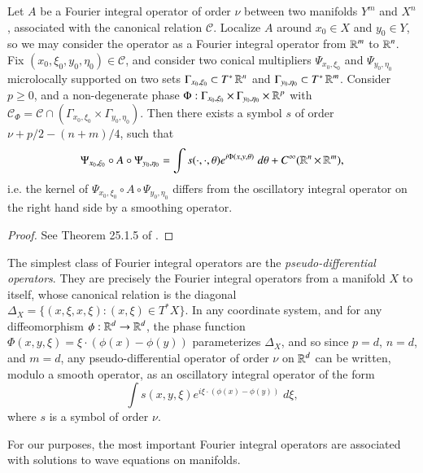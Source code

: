 \begin{theorem} \label{thm:equivalenceofphase}
  Let $A$ be a Fourier integral operator of order $\nu$ between two manifolds $Y^m$ and $X^n$, associated with the canonical relation $\mathcal{C}$. Localize $A$ around $x_0 \in X$ and $y_0 \in Y$, so we may consider the operator as a Fourier integral operator from $\operatorname{\mathbb{R}}^m$ to $\operatorname{\mathbb{R}}^n$. Fix $(x_0,\xi_0,y_0,\eta_0) \in \mathcal{C}$, and consider two conical multipliers $\Psi_{x_0,\xi_0}$ and $\Psi_{y_0,\eta_0}$ microlocally supported on two sets $\Gamma_{x_0,\xi_0} \subset T^* \operatorname{\mathbb{R}}^n$ and $\Gamma_{y_0,\eta_0} \subset T^* \operatorname{\mathbb{R}}^m$. Consider $p \geq 0$, and a non-degenerate phase $\Phi: \Gamma_{x_0,\xi_0} \times \Gamma_{y_0,\eta_0} \times \operatorname{\mathbb{R}}^p$ with $\mathcal{C}_\Phi = \mathcal{C} \cap (\Gamma_{x_0,\xi_0} \times \Gamma_{y_0,\eta_0})$. Then there exists a symbol $s$ of order $\nu + p/2 - (n+m)/4$, such that
  \[ \Psi_{x_0,\xi_0} \circ A \circ \Psi_{y_0,\eta_0} = \int s(\cdot,\cdot,\theta) e^{i \Phi(x,y,\theta)}\; d\theta + C^\infty(\operatorname{\mathbb{R}}^n \times \operatorname{\mathbb{R}}^m), \]
  i.e. the kernel of $\Psi_{x_0,\xi_0} \circ A \circ \Psi_{y_0,\eta_0}$ differs from the oscillatory integral operator on the right hand side by a smoothing operator.
\end{theorem}
\begin{proof}
  See Theorem 25.1.5 of \cite{Hormander4}.
\end{proof}

The simplest class of Fourier integral operators are the \emph{pseudo-differential operators}. They are precisely the Fourier integral operators from a manifold $X$ to itself, whose canonical relation is the diagonal $\Delta_X = \{ (x,\xi,x,\xi): (x,\xi) \in T^* X \}$. In any coordinate system, and for any diffeomorphism $\phi: \operatorname{\mathbb{R}}^d \to \operatorname{\mathbb{R}}^d$, the phase function $\Phi(x,y,\xi) = \xi \cdot (\phi(x) - \phi(y))$ parameterizes $\Delta_X$, and so since $p = d$, $n = d$, and $m = d$, any pseudo-differential operator of order $\nu$ on $\operatorname{\mathbb{R}}^d$ can be written, modulo a smooth operator, as an oscillatory integral operator of the form
%
\begin{equation}
  \int s(x,y,\xi) e^{i \xi \cdot (\phi(x) - \phi(y))}\; d\xi,
\end{equation}
%
where $s$ is a symbol of order $\nu$.

For our purposes, the most important Fourier integral operators are associated with solutions to wave equations on manifolds.

